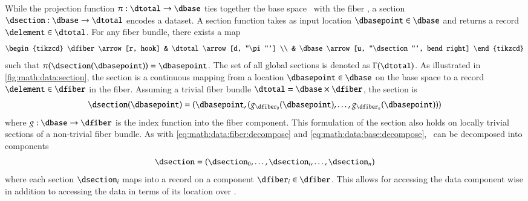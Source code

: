 \documentclass[journal]{vgtc}                %
\begin{document}
 While the projection function $\pi:\dtotal \rightarrow\dbase$ ties together the base space \dbase\ with the fiber \dfiber, a section $\dsection: \dbase\rightarrow \dtotal$ encodes a dataset. A section function takes as input location $\dbasepoint \in \dbase$ and returns a record $\delement \in \dtotal$. For any fiber bundle, there exists a map
 \begin{equation}
     \begin{tikzcd}
         \dfiber \arrow[r, hook] & \dtotal \arrow[d, "\pi"'] \\
                           & \dbase \arrow[u, "\dsection"', bend right]
     \end{tikzcd}
 \end{equation}
  such that $\pi(\dsection(\dbasepoint)) = \dbasepoint$. The set of all global sections is denoted as $\Gamma(\dtotal)$. As illustrated in \autoref{fig:math:data:section}, the section is a continuous mapping from a location $\dbasepoint \in \dbase$ on the base space to a record $\delement \in \dfiber$ in the fiber. Assuming a trivial fiber bundle $\dtotal = \dbase \times \dfiber$, the section is 
 \begin{equation}
     \label{eq:section_return}
     \dsection(\dbasepoint) = (\dbasepoint, (g_{\dfiber_{0}}(\dbasepoint), \ldots, g_{\dfiber_{n}}(\dbasepoint)))
 \end{equation}
 where $g: \dbase \rightarrow \dfiber$ is the index function into the fiber component. This formulation of the section also holds on locally trivial sections of a non-trivial fiber bundle. As with \autoref{eq:math:data:fiber:decompose} and \autoref{eq:math:data:base:decompose}, \dsection\ can be decomposed into components 
 \begin{equation}
 \label{eq:math:data:section:decompose}
 \dsection= (\dsection_0,\ldots, \dsection_i, \dots, \dsection_n) 
 \end{equation}
 where each section $\dsection_i$ maps into a record on a component $\dfiber_i \in \dfiber$. This allows for accessing the data component wise in addition to accessing the data in terms of its location over \dbase.
\end{document}
